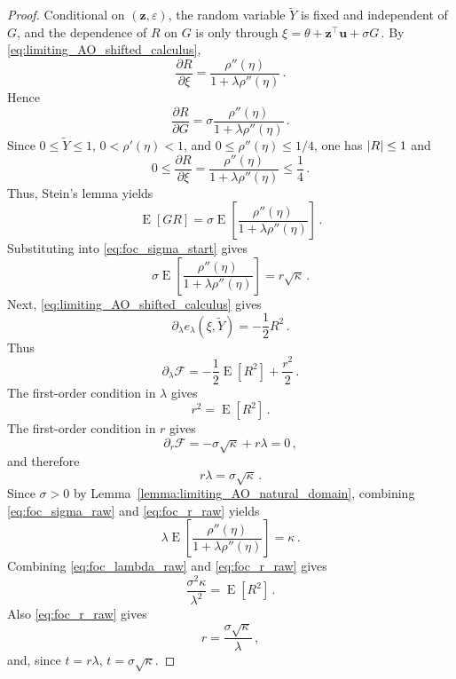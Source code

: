 \documentclass{article}
\makeatletter
\DeclareMathOperator{\expect}{E}
\theoremstyle{definition}
\newcommand{\abs}[1]{%
	\ensuremath{%
		\if@display
		\left| #1 \right|
		\else
		\lvert #1 \rvert
		\fi
	}%
}
\newcommand*{\bb}{\boldsymbol}
\def\bu{\bb{u}}
\def\Ytil{\widetilde{Y}}
\def\bz{\bb{z}}
\makeatother
\begin{document}
\begin{bibunit}
\begin{proof}
	Conditional on $(\bz,\varepsilon)$, the random variable $\Ytil$ is fixed and independent of $G$, and the dependence of $R$ on $G$ is only through $\xi=\theta+\bz^\top\bu+\sigma G\,.$
	By \eqref{eq:limiting_AO_shifted_calculus},
	$$
		\frac{\partial R}{\partial \xi}
		=
		\frac{\rho''(\eta)}
		{1+\lambda\rho''(\eta)}\,.
	$$
	Hence
	$$
		\frac{\partial R}{\partial G}
		=
		\sigma
		\frac{\rho''(\eta)}
		{1+\lambda\rho''(\eta)}\,.
	$$
	Since $0\leq\Ytil\leq1$, $0<\rho'(\eta)<1$, and
	$0\leq\rho''(\eta)\leq1/4$, one has $\abs{R}\leq1$
	and
	$$
		0
		\leq
		\frac{\partial R}{\partial\xi}
		=
		\frac{\rho''(\eta)}{1+\lambda\rho''(\eta)}
		\leq
		\frac14\,.
	$$
	Thus, 
	Stein's lemma \citep[Lemma~1]{stein:1981} yields
	$$
		\expect[GR]
		=
		\sigma
		\expect\left[
			\frac{\rho''(\eta)}
			{1+\lambda\rho''(\eta)}
		\right]\,.
	$$
	Substituting into \eqref{eq:foc_sigma_start} gives
	\begin{equation}
		\label{eq:foc_sigma_raw}
		\sigma
		\expect\left[
			\frac{\rho''(\eta)}
			{1+\lambda\rho''(\eta)}
		\right]
		=
		r\sqrt\kappa\,.
	\end{equation}
	Next, \eqref{eq:limiting_AO_shifted_calculus} gives
	$$
		\partial_\lambda e_\lambda(\xi,\Ytil)
		=
		-\frac12R^2\,.
	$$
	Thus
	$$
		\partial_\lambda\mathcal F
		=
		-\frac12\expect[R^2]
		+
		\frac{r^2}{2}\,.
	$$
	The first-order condition in $\lambda$ gives
	\begin{equation}
		\label{eq:foc_lambda_raw}
		r^2=\expect[R^2]\,.
	\end{equation}
	The first-order condition in $r$ gives
	$$
		\partial_r\mathcal F
		=
		-\sigma\sqrt\kappa+r\lambda
		=
		0\,,
	$$
	and therefore
	\begin{equation}
		\label{eq:foc_r_raw}
		r\lambda=\sigma\sqrt\kappa\,.
	\end{equation}
	Since $\sigma>0$ by Lemma~\ref{lemma:limiting_AO_natural_domain}, combining \eqref{eq:foc_sigma_raw} and \eqref{eq:foc_r_raw} yields
	\begin{equation}
		\label{eq:foc_curvature_raw}
		\lambda
		\expect\left[
			\frac{\rho''(\eta)}
			{1+\lambda\rho''(\eta)}
		\right]
		=
		\kappa\,.
	\end{equation}
	Combining \eqref{eq:foc_lambda_raw} and \eqref{eq:foc_r_raw} gives
	\begin{equation}
		\label{eq:foc_residual_raw}
		\frac{\sigma^2\kappa}{\lambda^2}
		=
		\expect[R^2]\,.
	\end{equation}
	Also \eqref{eq:foc_r_raw} gives
	$$
		r=\frac{\sigma\sqrt\kappa}{\lambda}\,,
	$$
	and, since $t=r\lambda$, $t=\sigma\sqrt\kappa$.

\end{proof}
\end{bibunit}
\end{document}
